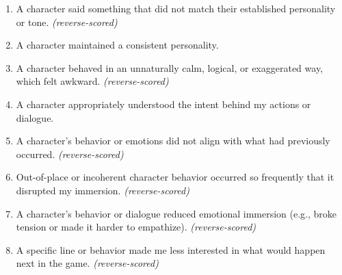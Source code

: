 \documentclass[12pt]{article}
\begin{document}
\begin{enumerate}[resume]
    \item A character said something that did not match their established personality or tone. \textit{(reverse-scored)}
    \item A character maintained a consistent personality.
    \item A character behaved in an unnaturally calm, logical, or exaggerated way, which felt awkward. \textit{(reverse-scored)}
    \item A character appropriately understood the intent behind my actions or dialogue.
    \item A character's behavior or emotions did not align with what had previously occurred. \textit{(reverse-scored)}
    \item Out-of-place or incoherent character behavior occurred so frequently that it disrupted my immersion. \textit{(reverse-scored)}
    \item A character's behavior or dialogue reduced emotional immersion (e.g., broke tension or made it harder to empathize). \textit{(reverse-scored)}
    \item A specific line or behavior made me less interested in what would happen next in the game. \textit{(reverse-scored)}
\end{enumerate}
\end{document}

